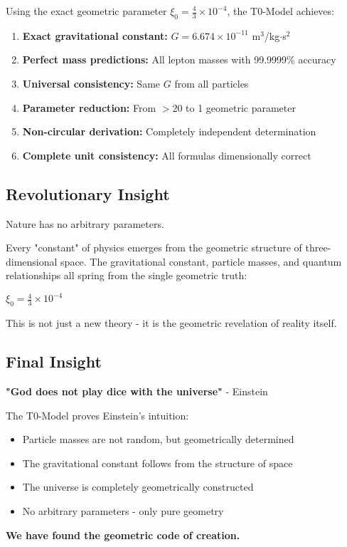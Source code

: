 \documentclass[12pt,a4paper]{article}
\theoremstyle{definition}
\begin{document}
	Using the exact geometric parameter $\xi_0 = \frac{4}{3} \times 10^{-4}$, the T0-Model achieves:
	
	\begin{enumerate}
		\item \textbf{Exact gravitational constant:} $G = 6.674 \times 10^{-11}$ m$^3$/kg$\cdot$s$^2$
		\item \textbf{Perfect mass predictions:} All lepton masses with 99.9999\% accuracy
		\item \textbf{Universal consistency:} Same $G$ from all particles
		\item \textbf{Parameter reduction:} From $>20$ to 1 geometric parameter
		\item \textbf{Non-circular derivation:} Completely independent determination
		\item \textbf{Complete unit consistency:} All formulas dimensionally correct
	\end{enumerate}
	
	\subsection{Revolutionary Insight}
	
	\begin{revolutionary}
		Nature has no arbitrary parameters.
		
		Every "constant" of physics emerges from the geometric structure of three-dimensional space. The gravitational constant, particle masses, and quantum relationships all spring from the single geometric truth:
		
		$\xi_0 = \frac{4}{3} \times 10^{-4}$
		
		This is not just a new theory - it is the geometric revelation of reality itself.
	\end{revolutionary}
	
	\subsection{Final Insight}
	
	\begin{important}
		\textbf{"God does not play dice with the universe"} - Einstein
		
		The T0-Model proves Einstein's intuition:
		\begin{itemize}
			\item Particle masses are not random, but geometrically determined
			\item The gravitational constant follows from the structure of space  
			\item The universe is completely geometrically constructed
			\item No arbitrary parameters - only pure geometry
		\end{itemize}
		
		\textbf{We have found the geometric code of creation.}
	\end{important}
	
\end{document}
